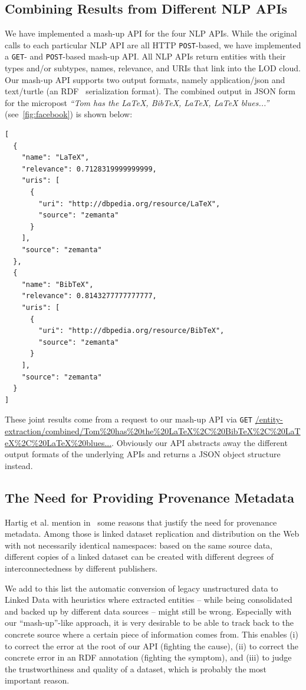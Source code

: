 \documentclass[conference]{IEEEtran}
\begin{document}
\subsection{Combining Results from Different NLP APIs}                     \label{sec:consolidation-nlp}
We have implemented a mash-up API for the four NLP APIs. While the original calls to each particular NLP API are all HTTP \texttt{POST}-based, we have implemented a \texttt{GET}- and \texttt{POST}-based mash-up API. All NLP APIs return entities with their types and/or subtypes, names, relevance, and URIs that link into the LOD cloud. Our mash-up API supports two output formats, namely application/json and text/turtle (an RDF~\cite{RDF} serialization format). The combined output in JSON form for the micropost \emph{``Tom has the LaTeX, BibTeX, LaTeX, LaTeX blues...''} (see~\autoref{fig:facebook}) is shown below:
\begin{lstlisting}
[
  {
    "name": "LaTeX",
    "relevance": 0.7128319999999999,
    "uris": [
      {
        "uri": "http://dbpedia.org/resource/LaTeX",
        "source": "zemanta"
      }
    ],
    "source": "zemanta"
  },
  {
    "name": "BibTeX",
    "relevance": 0.8143277777777777,
    "uris": [
      {
        "uri": "http://dbpedia.org/resource/BibTeX",
        "source": "zemanta"
      }
    ],
    "source": "zemanta"
  }  
]
\end{lstlisting}

These joint results come from a request to our mash-up API via \texttt{GET} \url{/entity-extraction/combined/Tom%20has%20the%20LaTeX%2C%20BibTeX%2C%20LaTeX%2C%20LaTeX%20blues...}. Obviously our API abstracts away the different output formats of the underlying APIs and returns a JSON object structure instead.

\subsection{The Need for Providing Provenance Metadata}
Hartig et al. mention in~\cite{ipaw10:olaf} some reasons that justify the need for provenance metadata. Among those is linked dataset replication and distribution on the Web with not necessarily identical namespaces: based on the same source data, different copies of a linked dataset can be created with different degrees of interconnectedness by different publishers.

We add to this list the automatic conversion of legacy unstructured data to Linked Data with heuristics where extracted entities -- while being consolidated and backed up by different data sources -- might still be wrong. Especially with our ``mash-up''-like approach, it is very desirable to be able to track back to the concrete source where a certain piece of information comes from. This enables (i) to correct the error at the root of our API (fighting the cause), (ii) to correct the concrete error in an RDF annotation (fighting the symptom), and (iii) to judge the trustworthiness and quality of a dataset, which is probably the most important reason.
\end{document}
